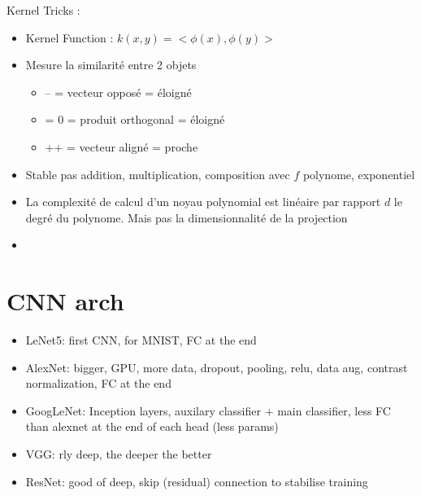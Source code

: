 \documentclass{article}
\theoremstyle{plain}%
\theoremstyle{definition}
\theoremstyle{remark}
\begin{document}
Kernel Tricks :
\begin{itemize}
    \item Kernel Function : $ k(x,y) = <\phi (x), \phi(y)> $
    \item Mesure la similarité entre 2 objets \begin{itemize}
        \item -- = vecteur opposé = éloigné
        \item = 0 = produit orthogonal = éloigné
        \item ++ = vecteur aligné = proche
    \end{itemize}
    \item Stable pas addition, multiplication, composition avec $ f $ polynome, exponentiel
    \item La complexité de calcul d'un noyau polynomial est linéaire par rapport $d$ le degré du polynome. Mais pas la dimensionnalité de la projection
    \item
\end{itemize}






\section{CNN arch}
\begin{itemize}
    \item LeNet5: first CNN, for MNIST, FC at the end
    \item AlexNet: bigger, GPU, more data, dropout, pooling, relu, data aug, contrast normalization, FC at the end
    \item GoogLeNet: Inception layers, auxilary classifier + main classifier, less FC than alexnet at the end of each head (less params) 
    \item VGG: rly deep, the deeper the better
    \item ResNet: good of deep, skip (residual) connection to stabilise training
\end{itemize}
\end{document}
